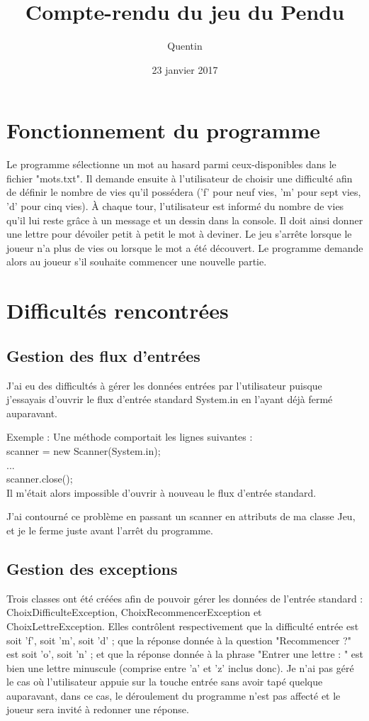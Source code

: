 \documentclass{report}
\title{Compte-rendu du jeu du Pendu}
\author{Quentin \bsc{SAUVAGE}}
\date{23 janvier 2017}
\begin{document}
\maketitle
\chapter{Fonctionnement du programme}
Le programme sélectionne un mot au hasard parmi ceux-disponibles dans le fichier "mots.txt". Il demande ensuite à l'utilisateur de choisir une difficulté afin de définir le nombre de vies qu'il possédera ('f' pour neuf vies, 'm' pour sept vies, 'd' pour cinq vies). À chaque tour, l'utilisateur est informé du nombre de vies qu'il lui reste grâce à un message et un dessin dans la console. Il doit ainsi donner une lettre pour dévoiler petit à petit le mot à deviner. Le jeu s'arrête lorsque le joueur n'a plus de vies ou lorsque le mot a été découvert. Le programme demande alors au joueur s'il souhaite commencer une nouvelle partie.
\chapter{Difficultés rencontrées}
\section{Gestion des flux d'entrées}
J'ai eu des difficultés à gérer les données entrées par l'utilisateur puisque j'essayais d'ouvrir le flux d'entrée standard System.in en l'ayant déjà fermé auparavant.

Exemple : Une méthode comportait les lignes suivantes :\\scanner = new Scanner(System.in); \\...\\scanner.close();\\
Il m'était alors impossible d'ouvrir à nouveau le flux d'entrée standard.

J'ai contourné ce problème en passant un scanner en attributs de ma classe Jeu, et je le ferme juste avant l'arrêt du programme.

\section{Gestion des exceptions}
Trois classes ont été créées afin de pouvoir gérer les données de l'entrée standard : ChoixDifficulteException, ChoixRecommencerException et ChoixLettreException. Elles contrôlent respectivement que la difficulté entrée est soit 'f', soit 'm', soit 'd' ; que la réponse donnée à la question "Recommencer ?" est soit 'o', soit 'n' ; et que la réponse donnée à la phrase "Entrer une lettre : " est bien une lettre minuscule (comprise entre 'a' et 'z' inclus donc). Je n'ai pas géré le cas où l'utilisateur appuie sur la touche entrée sans avoir tapé quelque auparavant, dans ce cas, le déroulement du programme n'est pas affecté et le joueur sera invité à redonner une réponse.
\end{document}
